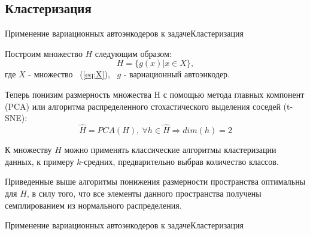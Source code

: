 \documentclass{beamer}
\begin{document}
\subsection{Кластеризация}

\begin{frame}{Применение вариационных автоэнкодеров к задаче}{Кластеризация}

Построим множество $H$ следующим образом:
\begin{equation}\label{eq:H}
H = \{g(x) | x \in X\},
\end{equation}
где $X$ - множество ~(\ref{eq:X}), ~$g$ - вариационный автоэнкодер. \par\medskip
Теперь понизим размерность множества H с помощью метода главных компонент (PCA) или алгоритма распределенного стохастического выделения соседей (t-SNE):
\begin{equation}
\hat{H} = PCA(H), ~\forall h \in \hat{H} \Rightarrow dim(h) = 2
\end{equation}

К множеству $\hat{H}$ можно применять классические алгоритмы кластеризации данных, к примеру $k$-средних, предварительно выбрав количество классов.


Приведенные выше алгоритмы понижения размерности пространства оптимальны для $H$, в силу того, что все элементы данного пространства получены семплированием из нормального распределения.

\end{frame}

\begin{frame}{Применение вариационных автоэнкодеров к задаче}{Кластеризация}

\begin{figure}[h]
\label{fig:images_p}
\end{figure}

\end{frame}
\end{document}
